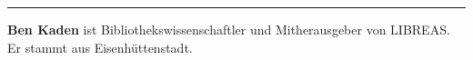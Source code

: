 \begin{center}\rule{0.5\linewidth}{\linethickness}\end{center}

\textbf{Ben Kaden} ist Bibliothekswissenschaftler und Mitherausgeber von
LIBREAS. Er stammt aus Eisenhüttenstadt.
